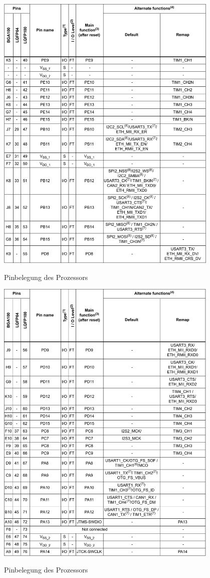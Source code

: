 \begin{table}[htb]\ContinuedFloat
    \centering
    \includegraphics[width=0.8\textwidth]{Schuh/Pictures/Pinbelegung3}
    \caption[Pinbelegung des Prozessors]{Pinbelegung des Prozessors}
\end{table}
\begin{table}[htb]\ContinuedFloat
    \centering
    \includegraphics[width=0.8\textwidth]{Schuh/Pictures/Pinbelegung4}
    \caption[Pinbelegung des Prozessors]{Pinbelegung des Prozessors}
\end{table}
